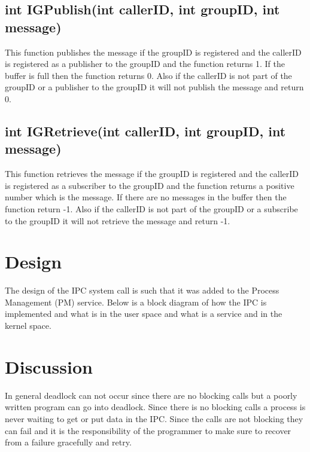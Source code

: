 \documentclass{article}
\begin{document}
\subsection{int IGPublish(int callerID, int groupID, int message)}
This function publishes the message if the groupID is registered and the callerID is registered as a publisher to the groupID and the function returns 1. If the buffer is full then the function returns 0. Also if the callerID is not part of the groupID or a publisher to the groupID it will not publish the message and return 0.

\subsection{int IGRetrieve(int callerID, int groupID, int message)}
This function retrieves the message if the groupID is registered and the callerID is registered as a subscriber to the groupID and the function returns a positive number which is the message. If there are no messages in the buffer then the function return -1. Also if the callerID is not part of the groupID or a subscribe to the groupID it will not retrieve the message and return -1.


\section{Design}
The design of the IPC system call is such that it was added to the Process Management (PM) service. Below is a block diagram of how the IPC is implemented and what is in the user space and what is a service and in the kernel space. 

\begin{figure}[!h]
\end{figure}

\section{Discussion}
In general deadlock can not occur since there are no blocking calls but a poorly written program can go into deadlock. Since there is no blocking calls a process is never waiting to get or put data in the IPC. Since the calls are not blocking they can fail and it is the responsibility of the programmer to make sure to recover from a failure gracefully and retry. 
\end{document}
